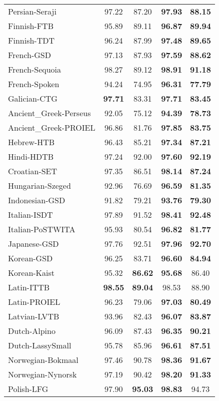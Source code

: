 \begin{longtable}{p{5cm}cccc}
Persian-Seraji & 97.22 & 87.20 & \bf 97.93 & \bf 88.15 \\
Finnish-FTB & 95.89 & 89.11 & \bf 96.87 & \bf 89.94 \\
Finnish-TDT & 96.24 & 87.99 & \bf 97.48 & \bf 89.65 \\
French-GSD & 97.13 & 87.93 & \bf 97.59 & \bf 88.62 \\
French-Sequoia & 98.27 & 89.12 & \bf 98.91 & \bf 91.18 \\
French-Spoken & 94.24 & 74.95 & \bf 96.31 & \bf 77.79 \\
Galician-CTG & \bf 97.71 & 83.31 & \bf 97.71 & \bf 83.45 \\
Ancient\_Greek-Perseus & 92.05 & 75.12 & \bf 94.39 & \bf 78.73 \\
Ancient\_Greek-PROIEL & 96.86 & 81.76 & \bf 97.85 & \bf 83.75 \\
Hebrew-HTB & 96.43 & 85.21 & \bf 97.34 & \bf 87.21 \\
Hindi-HDTB & 97.24 & 92.00 & \bf 97.60 & \bf 92.19 \\
Croatian-SET & 97.35 & 86.51 & \bf 98.14 & \bf 87.24 \\
Hungarian-Szeged & 92.96 & 76.69 & \bf 96.59 & \bf 81.35 \\
Indonesian-GSD & 91.82 & 79.21 & \bf 93.76 & \bf 79.30 \\
Italian-ISDT & 97.89 & 91.52 & \bf 98.41 & \bf 92.48 \\
Italian-PoSTWITA & 95.93 & 80.54 & \bf 96.82 & \bf 81.77 \\
Japanese-GSD & 97.76 & 92.51 & \bf 97.96 & \bf 92.70 \\
Korean-GSD & 96.25 & 83.71 & \bf 96.60 & \bf 84.94 \\
Korean-Kaist & 95.32 & \bf 86.62 & \bf 95.68 & 86.40 \\
Latin-ITTB & \bf 98.55 & \bf 89.04 & 98.53 & 88.90 \\
Latin-PROIEL & 96.23 & 79.06 & \bf 97.03 & \bf 80.49 \\
Latvian-LVTB & 93.96 & 82.43 & \bf 96.07 & \bf 83.87 \\
Dutch-Alpino & 96.09 & 87.43 & \bf 96.35 & \bf 90.21 \\
Dutch-LassySmall & 95.78 & 85.96 & \bf 96.61 & \bf 87.51 \\
Norwegian-Bokmaal & 97.46 & 90.78 & \bf 98.36 & \bf 91.67 \\
Norwegian-Nynorsk & 97.19 & 90.42 & \bf 98.20 & \bf 91.33 \\
Polish-LFG & 97.90 & \bf 95.03 & \bf 98.83 & 94.73 \\

\end{longtable}
